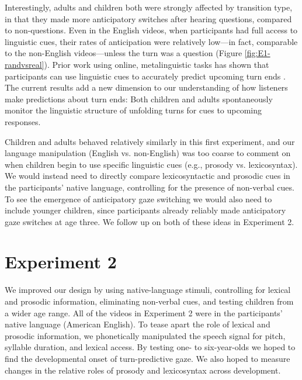 \documentclass[authoryear, 12pt]{elsarticle}
\begin{document}
Interestingly, adults and children both were strongly affected by transition type, in that they made more anticipatory switches after hearing questions, compared to non-questions. Even in the English videos, when participants had full access to linguistic cues, their rates of anticipation were relatively low---in fact, comparable to the non-English videos---unless the turn was a question (Figure \ref{fig:E1-randvsreal}). Prior work using online, metalinguistic tasks has shown that participants can use linguistic cues to accurately predict upcoming turn ends \citep{torreira2015, magyari2012, de-ruiter2006}. The current results add a new dimension to our understanding of how listeners make predictions about turn ends: Both children and adults spontaneously monitor the linguistic structure of unfolding turns for cues to upcoming responses.

Children and adults behaved relatively similarly in this first experiment, and our language manipulation (English vs. non-English) was too coarse to comment on when children begin to use specific linguistic cues (e.g., prosody vs. lexicosyntax). We would instead need to directly compare lexicosyntactic and prosodic cues in the participants' native language, controlling for the presence of non-verbal cues. To see the emergence of anticipatory gaze switching we would also need to include younger children, since participants already reliably made anticipatory gaze switches at age three. We follow up on both of these ideas in Experiment 2. 

\section{Experiment 2}
\label{sec:exp2}

We improved our design by using native-language stimuli, controlling for lexical and prosodic information, eliminating non-verbal cues, and testing children from a wider age range. All of the videos in Experiment 2 were in the participants' native language (American English). To tease apart the role of lexical and prosodic information, we phonetically manipulated the speech signal for pitch, syllable duration, and lexical access. By testing one- to six-year-olds we hoped to find the developmental onset of turn-predictive gaze. We also hoped to measure changes in the relative roles of prosody and lexicosyntax across development.
\end{document}
